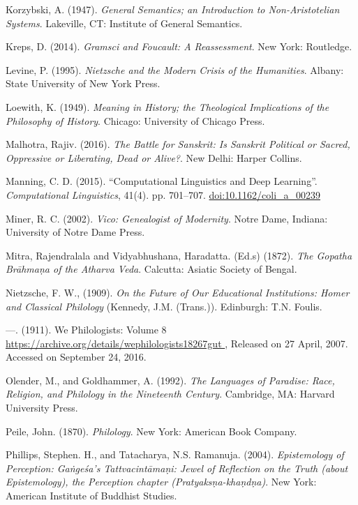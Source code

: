 \begin{thebibliography}{99}
  Korzybski, A. (1947). \textit{General Semantics; an Introduction to Non-Aristotelian Systems}. Lakeville, CT: Institute of General Semantics.

  Kreps, D. (2014). \textit{Gramsci and Foucault: A Reassessment}. New York: Routledge.

  Levine, P. (1995). \textit{Nietzsche and the Modern Crisis of the Humanities}. Albany: State University of New York Press.

  Loewith, K. (1949). \textit{Meaning in History; the Theological Implications of the Philosophy of History}. Chicago: University of Chicago Press.

  Malhotra, Rajiv. (2016). \textit{The Battle for Sanskrit: Is Sanskrit Political or Sacred, Oppressive or Liberating, Dead or Alive?}. New Delhi: Harper Collins.

  Manning, C. D. (2015). “Computational Linguistics and Deep Learning”. \textit{Computational Linguistics}, 41(4). pp. 701--707. \url{doi:10.1162/coli_a_00239}

  Miner, R. C. (2002). \textit{Vico: Genealogist of Modernity}. Notre Dame, Indiana: University of Notre Dame Press.

  Mitra, Rajendralala and Vidyabhushana, Haradatta. (Ed.s) (1872). \textit{The Gopatha Brāhmaṇa of the Atharva Veda}. Calcutta: Asiatic Society of Bengal.

  Nietzsche, F. W., (1909). \textit{On the Future of Our Educational Institutions: Homer and Classical Philology} (Kennedy, J.M. (Trans.)). Edinburgh: T.N. Foulis.

  —. (1911). We Philologists: Volume 8 \url{ https://archive.org/details/wephilologists18267gut }, Released on 27 April, 2007. Accessed on September 24, 2016.

  Olender, M., and Goldhammer, A. (1992). \textit{The Languages of Paradise: Race, Religion, and Philology in the Nineteenth Century}. Cambridge, MA: Harvard University Press.

  Peile, John. (1870). \textit{Philology}. New York: American Book Company.

  Phillips, Stephen. H., and Tatacharya, N.S. Ramanuja. (2004). \textit{Epistemology of Perception: Gaṅgeśa's Tattvacintāmaṇi: Jewel of Reflection on the Truth (about Epistemology), the Perception chapter (Pratyaksṇa-khaṇdṇa)}. New York: American Institute of Buddhist Studies.


\end{thebibliography}
